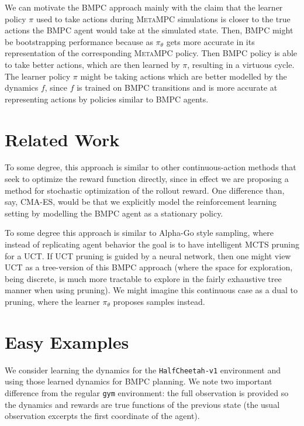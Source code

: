 \documentclass{article}
\begin{document}
We can motivate the \textsc{BMPC} approach mainly with the claim that the learner policy $\pi$ used to take actions during \textsc{MetaMPC} simulations is closer to the true actions the \textsc{BMPC} agent would take at the simulated state. Then, \textsc{BMPC} might be bootstrapping performance because as $\pi_\theta$ gets more accurate in its representation of the corresponding \textsc{MetaMPC} policy. Then \textsc{BMPC} policy is able to take better actions, which are then learned by $\pi$, resulting in a virtuous cycle. The learner policy $\pi$ might be taking actions which are better modelled by the dynamics $f$, since $f$ is trained on \textsc{BMPC} transitions and is more accurate at representing actions by policies similar to \textsc{BMPC} agents.


\section{Related Work}

To some degree, this approach is similar to other continuous-action methods that seek to optimize the reward function directly, since in effect we are proposing a method for stochastic optimization of the rollout reward. One difference than, say, CMA-ES, would be that we explicitly model the reinforcement learning setting by modelling the \textsc{BMPC} agent as a stationary policy.

To some degree this approach is similar to Alpha-Go style sampling, where instead of replicating agent behavior the goal is to have intelligent MCTS pruning for a UCT. If UCT pruning is guided by a neural network, then one might view UCT as a tree-version of this \textsc{BMPC} approach (where the space for exploration, being discrete, is much more tractable to explore in the fairly exhaustive tree manner when using pruning). We might imagine this continuous case as a dual to pruning, where the learner $\pi_\theta$ proposes samples instead.

\section{Easy Examples}

We consider learning the dynamics for the \texttt{HalfCheetah-v1} environment and using those learned dynamics for \textsc{BMPC} planning. We note two important difference from the regular \texttt{gym} environment: the full observation is provided so the dynamics and rewards are true functions of the previous state (the usual observation excerpts the first coordinate of the agent).
\end{document}
